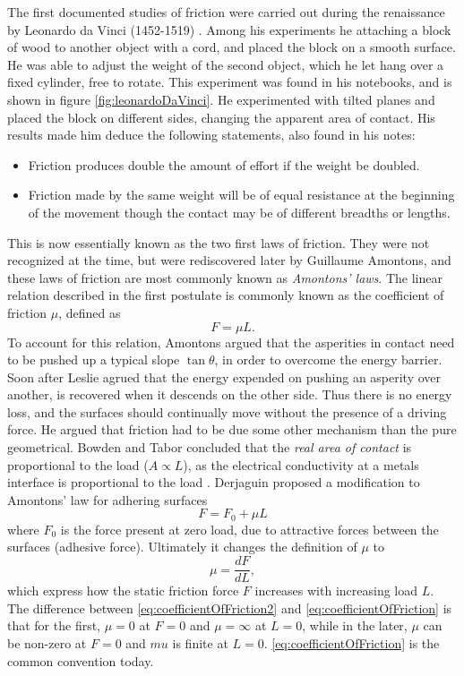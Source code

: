 \documentclass[twoside,english]{uiofysmaster}
\begin{document}
\noindent 
The first documented studies of friction were carried out during the renaissance by Leonardo da Vinci (1452-1519) \cite{LeonardoDaVinciStudies}.
Among his experiments he attaching a block of wood to another object with a cord, and placed the block on a smooth surface.
He was able to adjust the weight of the second object, which he let hang over a fixed cylinder, free to rotate. 
This experiment was found in his notebooks, and is shown in figure \ref{fig:leonardoDaVinci}.
He experimented with tilted planes and placed the block on different sides, changing the apparent area of contact.
His results made him deduce the following statements, also found in his notes:
\begin{itemize}
	\item Friction produces double the amount of effort if the weight be doubled. 
	\item Friction made by the same weight will be of equal resistance at the beginning of the movement though the contact may be of different breadths or lengths.
\end{itemize}
This is now essentially known as the two first laws of friction. 
They were not recognized at the time, but were rediscovered later by Guillaume Amontons, and these laws of friction are most commonly known as \textit{Amontons' laws}.
The linear relation described in the first postulate is commonly known as the coefficient of friction $\mu$, defined as
\begin{equation}
F = \mu L \label{eq:coefficientOfFriction2}.
\end{equation}
To account for this relation, Amontons argued that the asperities in contact need to be pushed up a typical slope $\tan\theta$, in order to overcome the energy barrier.
Soon after Leslie agrued that the energy expended on pushing an asperity over another, is recovered when it descends on the other side. 
Thus there is no energy loss, and the surfaces should continually move without the presence of a driving force. 
He argued that friction had to be due some other mechanism than the pure geometrical.
Bowden and Tabor concluded that the \textit{real area of contact} is proportional to the load ($A \propto L$), as the electrical conductivity at a metals interface is proportional to the load \cite{bowden2001friction}.
Derjaguin proposed a modification to Amontons' law for adhering surfaces
\begin{equation}
	F = F_0 + \mu L \label{eq:coefficientF0}
\end{equation}
where $F_0$ is the force present at zero load, due to attractive forces between the surfaces (adhesive force).
Ultimately it changes the definition of $\mu$ to 
\begin{equation}
\mu = \frac{dF}{dL}, \label{eq:coefficientOfFriction}
\end{equation}
which express how the static friction force $F$ increases with increasing load $L$.
The difference between \eqref{eq:coefficientOfFriction2} and \eqref{eq:coefficientOfFriction} is that for the first, $\mu=0$ at $F=0$ and $\mu=\infty$ at $L=0$, while in the later, $\mu$ can be non-zero at $F=0$ and $mu$ is finite at $L=0$.
\eqref{eq:coefficientOfFriction} is the common convention today.
 
\end{document}
